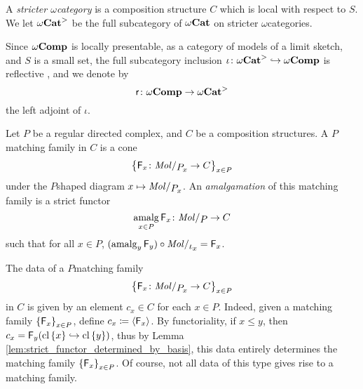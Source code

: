 \begin{dfn}
    A \emph{stricter \( \omega \)\nbd category} is a composition structure \( C \) which is local with respect to \( S \).
    We let \( {\omega\mathbf{Cat}}^> \) be the full subcategory of \( {\omega\mathbf{Cat}} \) on stricter \( \omega \)\nbd categories.
\end{dfn}

\noindent Since \( \omega\mathbf{Comp} \) is locally presentable, as a category of models of a limit sketch, and \( S \) is a small set, the full subcategory inclusion \( \iota \colon {\omega\mathbf{Cat}}^> \hookrightarrow \omega\mathbf{Comp} \) is reflective \cite{freyd1972continuous}, and we denote by 
\begin{equation*}
    \mathsf{r} \colon \omega\mathbf{Comp} \to {\omega\mathbf{Cat}}^>
\end{equation*}
the left adjoint of \( \iota \).

\begin{dfn} 
    Let \( P \) be a regular directed complex, and \( C \) be a composition structures.
    A \( P \)\nbd matching family in \( C \) is a cone 
    \begin{equation*}
        \set{\F_x \colon \molecin{\imel{P}{x}} \to C}_{x \in P}
    \end{equation*}
    under the \( P \)\nbd shaped diagram \( x \mapsto \molecin{\imel{P}{x}} \).    
    An \emph{amalgamation} of this matching family is a strict functor 
    \begin{equation*}
        \amalg_{x\in P} \F_x \colon \molecin{P} \to C
    \end{equation*}
    such that for all \( x \in P \), \( (\amalg_y \F_y) \after \molecin{\mapel{x}} = \F_x \).
\end{dfn}

\begin{rmk}\label{rmk:data_matching family}
    The data of a \( P \)\nbd matching family 
    \begin{equation*}
        \set{\F_x \colon \molecin{\imel{P}{x}} \to C}_{x \in P}
    \end{equation*}
    in \( C \) is given by an element \( c_x \in C \) for each \( x \in P \).
    Indeed, given a matching family \( \left\{ {\mathsf{F}_x} \right\}_{x \in P} \), define \( c_x \coloneqq \langle\mathsf{F}_x\rangle \).
    By functoriality, if \( x \le y \), then \( c_x = \mathsf{F}_y(\mathrm{cl}\left\{ {x} \right\} \hookrightarrow \mathrm{cl}\left\{ {y} \right\}) \), thus by Lemma \ref{lem:strict_functor_determined_by_basis}, this data entirely determines the matching family \( \left\{ {\mathsf{F}_x} \right\}_{x \in P} \).
    Of course, not all data of this type gives rise to a matching family. 
\end{rmk}

